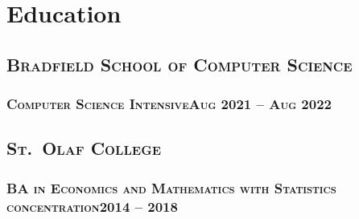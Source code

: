 \documentclass{article}
\newcommand{\resumeSection}[1]{\section*{#1}}
\newcommand{\institution}[1]{\subsection*{\scshape{#1}}}
\newcommand{\jobPosition}[3]{\subsubsection*{\scshape{#1}\hfill #2 -- #3}}
\begin{document}
\resumeSection{Education}
  \institution{Bradfield School of Computer Science}
    \jobPosition{Computer Science Intensive}{Aug 2021}{Aug 2022}


  \institution{St.\ Olaf College}
    \jobPosition{BA in Economics and Mathematics with Statistics concentration}{2014}{2018}
\end{document}
